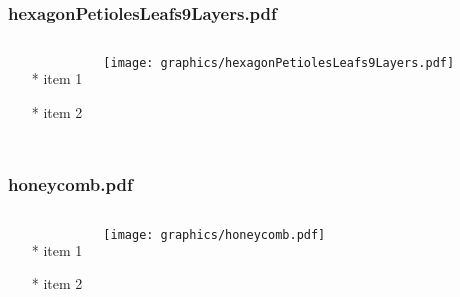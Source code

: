 \documentclass{beamer}
\begin{document}
\begin{frame} \frametitle{hexagonPetiolesLeafs9Layers.pdf}
    \begin{columns}[c]
        \begin{itemize}
            \item[*] item 1
            \item[*] item 2
        \end{itemize}
        \begin{minipage}{\linewidth}
            \begin{center}
            \texttt{[image: graphics/hexagonPetiolesLeafs9Layers.pdf]}
            \label{gfx:hexagonPetiolesLeafs9Layers.pdf}
            \end{center}
        \end{minipage}
    \end{columns}
\end{frame}

\begin{frame} \frametitle{honeycomb.pdf}
    \begin{columns}[c]
        \begin{itemize}
            \item[*] item 1
            \item[*] item 2
        \end{itemize}
        \begin{minipage}{\linewidth}
            \begin{center}
            \texttt{[image: graphics/honeycomb.pdf]}
            \label{gfx:honeycomb.pdf}
            \end{center}
        \end{minipage}
    \end{columns}
\end{frame}
\end{document}
